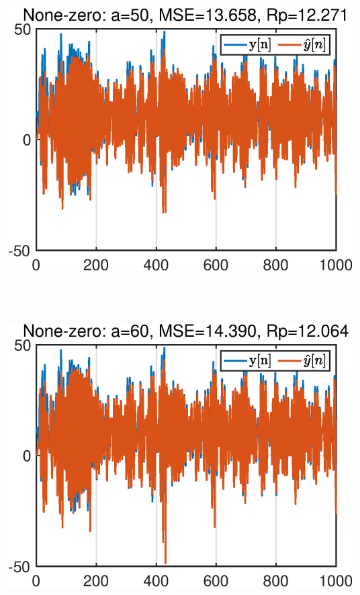 \begin{figure}[htb]
\begin{subfigure}[b]{0.33\textwidth}
         \centering
         \includegraphics[width=\textwidth]{fig/4/43b3.eps}
     \end{subfigure}
     \\
     \hspace{-0.4cm}
     \begin{subfigure}[b]{0.33\textwidth}
         \centering
         \includegraphics[width=\textwidth]{fig/4/43b4.eps}
     \end{subfigure}
    \hspace{-0.2cm}
     \begin{subfigure}[b]{0.33\textwidth}
         \centering

\end{subfigure}
\end{figure}
